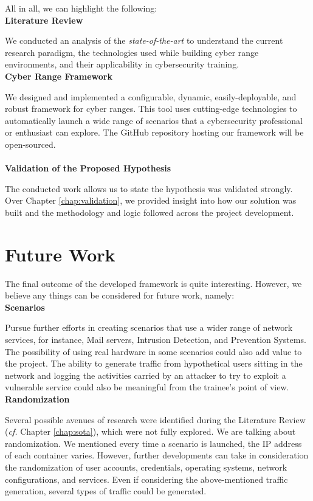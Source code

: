 All in all, we can highlight the following:\\

\textbf{Literature Review}

We conducted an analysis of the \textit{state-of-the-art} to understand the current research paradigm, the technologies used while building cyber range environments, and their applicability in cybersecurity training.\\

\textbf{Cyber Range Framework}

We designed and implemented a configurable, dynamic, easily-deployable, and robust framework for cyber ranges. This tool uses cutting-edge technologies to automatically launch a wide range of scenarios that a cybersecurity professional or enthusiast can explore. The GitHub repository hosting our framework will be open-sourced.\\\\

\textbf{Validation of the Proposed Hypothesis}

The conducted work allows us to state the hypothesis was validated strongly. Over Chapter \ref{chap:validation}, we provided insight into how our solution was built and the methodology and logic followed across the project development.

\section{Future Work} \label{sec:future_work}

The final outcome of the developed framework is quite interesting. However, we believe any things can be considered for future work, namely:\\

\textbf{Scenarios}

Pursue further efforts in creating scenarios that use a wider range of network services, for instance, Mail servers, Intrusion Detection, and Prevention Systems. The possibility of using real hardware in some scenarios could also add value to the project. The ability to generate traffic from hypothetical users sitting in the network and logging the activities carried by an attacker to try to exploit a vulnerable service could also be meaningful from the trainee's point of view.\\

\textbf{Randomization}

Several possible avenues of research were identified during the Literature Review (\textit{cf.} Chapter \ref{chap:sota}), which were not fully explored. We are talking about randomization. We mentioned every time a scenario is launched, the IP address of each container varies. However, further developments can take in consideration the randomization of user accounts, credentials, operating systems,  network configurations, and services. Even if considering the above-mentioned traffic generation, several types of traffic could be generated.\\


